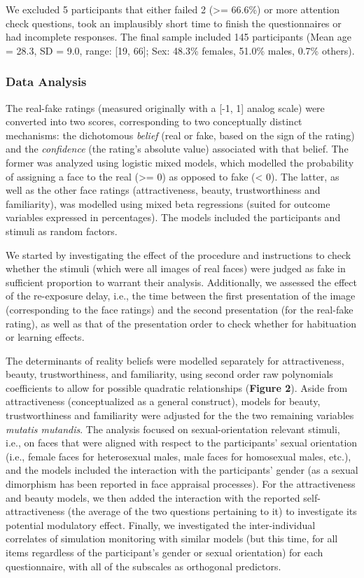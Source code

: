 \documentclass[
  man,floatsintext]{apa6}
\begin{document}
We excluded 5 participants that either failed 2 (\textgreater= 66.6\%) or more attention check questions, took an implausibly short time to finish the questionnaires or had incomplete responses. The final sample included 145 participants (Mean age = 28.3, SD = 9.0, range: {[}19, 66{]}; Sex: 48.3\% females, 51.0\% males, 0.7\% others).

\hypertarget{data-analysis}{%
\subsubsection{Data Analysis}\label{data-analysis}}

The real-fake ratings (measured originally with a {[}-1, 1{]} analog scale) were converted into two scores, corresponding to two conceptually distinct mechanisms: the dichotomous \emph{belief} (real or fake, based on the sign of the rating) and the \emph{confidence} (the rating's absolute value) associated with that belief. The former was analyzed using logistic mixed models, which modelled the probability of assigning a face to the real (\textgreater= 0) as opposed to fake (\textless{} 0). The latter, as well as the other face ratings (attractiveness, beauty, trustworthiness and familiarity), was modelled using mixed beta regressions (suited for outcome variables expressed in percentages). The models included the participants and stimuli as random factors.

We started by investigating the effect of the procedure and instructions to check whether the stimuli (which were all images of real faces) were judged as fake in sufficient proportion to warrant their analysis. Additionally, we assessed the effect of the re-exposure delay, i.e., the time between the first presentation of the image (corresponding to the face ratings) and the second presentation (for the real-fake rating), as well as that of the presentation order to check whether for habituation or learning effects.

The determinants of reality beliefs were modelled separately for attractiveness, beauty, trustworthiness, and familiarity, using second order raw polynomials coefficients to allow for possible quadratic relationships (\textbf{Figure 2}). Aside from attractiveness (conceptualized as a general construct), models for beauty, trustworthiness and familiarity were adjusted for the the two remaining variables \emph{mutatis mutandis}. The analysis focused on sexual-orientation relevant stimuli, i.e., on faces that were aligned with respect to the participants' sexual orientation (i.e., female faces for heterosexual males, male faces for homosexual males, etc.), and the models included the interaction with the participants' gender (as a sexual dimorphism has been reported in face appraisal processes). For the attractiveness and beauty models, we then added the interaction with the reported self-attractiveness (the average of the two questions pertaining to it) to investigate its potential modulatory effect. Finally, we investigated the inter-individual correlates of simulation monitoring with similar models (but this time, for all items regardless of the participant's gender or sexual orientation) for each questionnaire, with all of the subscales as orthogonal predictors.
\end{document}
